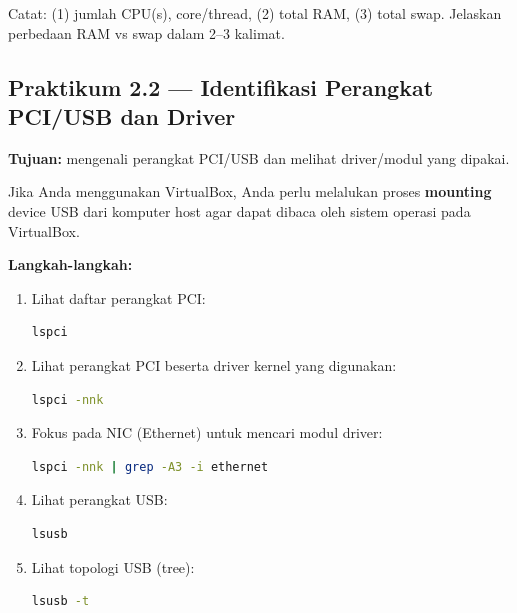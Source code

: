 \begin{exercisebox}[2.1]
Catat: (1) jumlah CPU(s), core/thread, (2) total RAM, (3) total swap. Jelaskan perbedaan RAM vs swap dalam 2--3 kalimat.
\end{exercisebox}

\subsection*{Praktikum 2.2 --- Identifikasi Perangkat PCI/USB dan Driver}
\textbf{Tujuan:} mengenali perangkat PCI/USB dan melihat driver/modul yang dipakai.

\begin{notebox}
Jika Anda menggunakan VirtualBox, Anda perlu melalukan proses \textbf{mounting} device USB dari komputer host agar dapat dibaca oleh sistem operasi pada VirtualBox.
\end{notebox}

\textbf{Langkah-langkah:}
\begin{enumerate}
    \item Lihat daftar perangkat PCI:
\begin{lstlisting}[language=bash, caption={Daftar perangkat PCI (ringkas)}]
lspci
\end{lstlisting}

    \item Lihat perangkat PCI beserta driver kernel yang digunakan:
\begin{lstlisting}[language=bash, caption={Melihat driver perangkat PCI}]
lspci -nnk
\end{lstlisting}

    \item Fokus pada NIC (Ethernet) untuk mencari modul driver:
\begin{lstlisting}[language=bash, caption={Mencari info NIC dan drivernya}]
lspci -nnk | grep -A3 -i ethernet
\end{lstlisting}

    \item Lihat perangkat USB:
\begin{lstlisting}[language=bash, caption={Daftar perangkat USB}]
lsusb
\end{lstlisting}

    \item Lihat topologi USB (tree):
\begin{lstlisting}[language=bash, caption={Topologi perangkat USB}]
lsusb -t
\end{lstlisting}
\end{enumerate}

